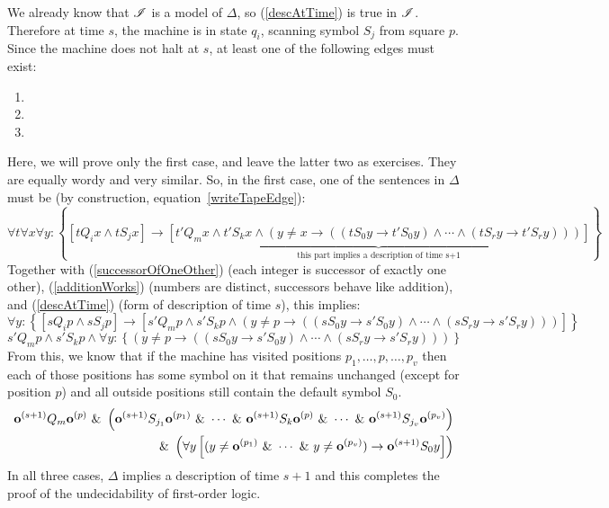 We already know that $\mathscr{I}$ is a model of $\Delta$, so (\ref{descAtTime}) is true in $\mathscr{I}$. Therefore at time $s$, the machine is in state $q_i$, scanning symbol $S_j$ from square $p$. Since the machine does not halt at $s$, at least one of the following edges must exist:
\begin{enumerate}
\item {}
\item {}
\item {}
\end{enumerate}
Here, we will prove only the first case, and leave the latter two as exercises. They are equally wordy and very similar. So, in the first case, one of the sentences in $\Delta$ must be (by construction, equation~\ref{writeTapeEdge}):
\[\forall t\forall x\forall y: \left\{ \left[t Q_i x \land t S_j x\right] \to \underbrace{\left[t' Q_m x \land t' S_k x \land (y \neq x \to ((t S_0 y \to t' S_0 y) \land \cdots \land (t S_r y \to t' S_r y)))\right]}_{\text{this part implies a description of time s+1}} \right\}\]
Together with (\ref{successorOfOneOther}) (each integer is successor of exactly one other), (\ref{additionWorks}) (numbers are distinct, successors behave like addition), and (\ref{descAtTime}) (form of description of time $s$), this implies:
\[\forall y: \left\{ \left[s Q_i p \land s S_j p\right] \to \left[s' Q_m p \land s' S_k p \land (y \neq p \to ((s S_0 y \to s' S_0 y) \land \cdots \land (s S_r y \to s' S_r y)))\right] \right\}\]
\[s' Q_m p \land s' S_k p \land \forall y: \left\{ (y \neq p \to ((s S_0 y \to s' S_0 y) \land \cdots \land (s S_r y \to s' S_r y)))\right\}\]
From this, we know that if the machine has visited positions $p_1,\ldots,p,\ldots,p_v$ then each of those positions has some symbol on it that remains unchanged (except for position $p$) and all outside positions still contain the default symbol $S_0$.
\begin{equation}
\begin{split}
\mathbf{o}^{(s+1)} Q_m \mathbf{o}^{(p)} ~\&~ \left( \mathbf{o}^{(s+1)} S_{j_1} \mathbf{o}^{(p_1)} ~\&~ \cdots ~\&~ \mathbf{o}^{(s+1)} S_k \mathbf{o}^{(p)} ~\&~ \cdots ~\&~ \mathbf{o}^{(s+1)} S_{j_v} \mathbf{o}^{(p_v)}\right) \\
~\&~ \left(\forall y \left[ (y \neq \mathbf{o}^{(p_1)} ~\&~ \cdots ~\&~ y \neq \mathbf{o}^{(p_v)}) \to \mathbf{o}^{(s+1)} S_0 y \right]\right)
\end{split}
\end{equation}
In all three cases, $\Delta$ implies a description of time $s+1$ and this completes the proof of the undecidability of first-order logic.